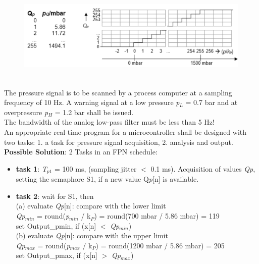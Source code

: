    \begin{figure}[h]
    \centering
    \includegraphics[width=12cm, height=4.5cm]{Images/image141.png}
    \label{fig:Fig }
    \end{figure}

The pressure signal is to be scanned by a process computer at a sampling frequency of 10 Hz. A warning signal at a low pressure \textit{p}${}_{L}$ = 0.7 bar and at overpressure \textit{p}${}_{H}$ = 1.2 bar shall be issued.\\

The bandwidth of the analog low-pass filter must be less than 5 Hz!\\

An appropriate real-time program for a microcontroller shall be designed with two tasks: 1. a task for pressure signal acquisition, 2. analysis and output.\\

\textbf{Possible Solution}: 2 Tasks in an FPN schedule:

\begin{itemize}
\item \textbf{task 1}:  \textit{T}${}_{p1}$ = 100 ms, (sampling jitter $<$  0.1 ms). Acquisition of values \textit{Qp}, setting the semaphore S1, if a new value Q\textit{p}[n] is available.

\item \textbf{task 2}:  wait for S1, then \\
(a) evaluate \textit{Qp}[n]:  compare with the lower limit\\
\textit{Qp}${}_{min}$ = round(\textit{p}${}_{min}$ / k${}_{P}$) = round(700 mbar / 5.86 mbar) = 119\\
set Output\_pmin, if (x[n] $\mathrm{<}$ \textit{Qp}${}_{min}$)\\

(b) evaluate \textit{Qp}[n]: compare with the upper limit  \\  \textit{Qp}${}_{max}$ = round(\textit{p}${}_{max}$ / k${}_{P}$) = round(1200 mbar / 5.86 mbar) = 205 \\ set Output\_pmax, if (x[n] $\mathrm{>}$ \textit{Qp}${}_{max}$)
\end{itemize}

